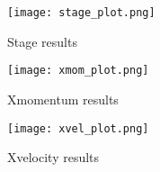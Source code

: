 \begin{figure}
\begin{center}
\texttt{[image: stage\_plot.png]}
\end{center}
\caption{Stage results}
\end{figure}


\begin{figure}
\begin{center}
\texttt{[image: xmom\_plot.png]}
\end{center}
\caption{Xmomentum results}
\end{figure}


\begin{figure}
\begin{center}
\texttt{[image: xvel\_plot.png]}
\end{center}
\caption{Xvelocity results}
\end{figure}


\endinput
